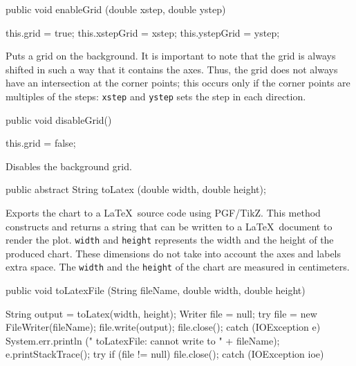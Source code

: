 \begin{code}

   public void enableGrid (double xstep, double ystep) \begin{hide} {
      this.grid = true;
      this.xstepGrid = xstep;
      this.ystepGrid = ystep;
   }\end{hide}
\end{code}
\begin{tabb}
   Puts a grid on the background. It is important to note that the grid is
   always shifted in such a way that it contains the axes. Thus, the grid does
   not always have an intersection at the corner points; this occurs
   only if the corner points are multiples of the steps: \texttt{xstep}
   and \texttt{ystep} sets the step in each direction.
\end{tabb}
\begin{htmlonly}
\end{htmlonly}
\begin{code}

   public void disableGrid() \begin{hide} {
      this.grid = false;
   }\end{hide}
\end{code}
\begin{tabb}
   Disables the background grid.
\end{tabb}
\begin{code}

   public abstract String toLatex (double width, double height);
\end{code}
\begin{tabb}
   Exports the chart to a \LaTeX\ source code using PGF/TikZ.
   This method constructs and returns a string that can be written to
   a \LaTeX\ document to render the plot. \texttt{width} and \texttt{height}
   represents the width and the height of the produced chart. These dimensions
   do not take into account the axes and labels extra space. The \texttt{width}
   and the \texttt{height} of the chart are measured in centimeters.
\end{tabb}
\begin{htmlonly}
\end{htmlonly}
\begin{code}

   public void toLatexFile (String fileName, double width, double height) \begin{hide} {
      String output = toLatex(width, height);
      Writer file = null;
      try {
         file = new FileWriter(fileName);
         file.write(output);
         file.close();
     } catch (IOException e) {
         System.err.println ("   toLatexFile:  cannot write to  " + fileName);
         e.printStackTrace();
         try {
            if (file != null)
               file.close();
         } catch (IOException ioe) {}
      }
  }\end{hide}
\end{code}
